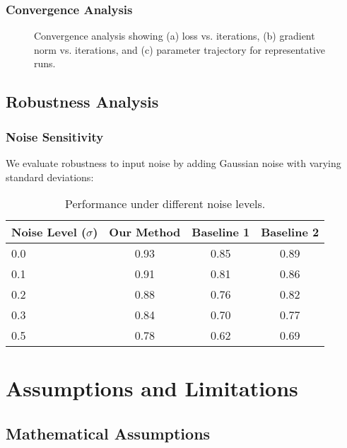 \subsubsection{Convergence Analysis}

\begin{figure}[htbp]
\centering
\caption{Convergence analysis showing (a) loss vs. iterations, (b) gradient norm vs. iterations, and (c) parameter trajectory for representative runs.}
\label{fig:convergence_analysis}
\end{figure}

\subsection{Robustness Analysis}
\label{app:robustness}

\subsubsection{Noise Sensitivity}

We evaluate robustness to input noise by adding Gaussian noise with varying standard deviations:

\begin{table}[htbp]
\centering
\caption{Performance under different noise levels.}
\label{tab:noise_robustness}
\begin{tabular}{lccc}
\toprule
Noise Level ($\sigma$) & Our Method & Baseline 1 & Baseline 2 \\
\midrule
0.0 & 0.93 & 0.85 & 0.89 \\
0.1 & 0.91 & 0.81 & 0.86 \\
0.2 & 0.88 & 0.76 & 0.82 \\
0.3 & 0.84 & 0.70 & 0.77 \\
0.5 & 0.78 & 0.62 & 0.69 \\
\bottomrule
\end{tabular}
\end{table}

\section{Assumptions and Limitations}
\label{app:assumptions}

\subsection{Mathematical Assumptions}
\label{app:math_assumptions}

